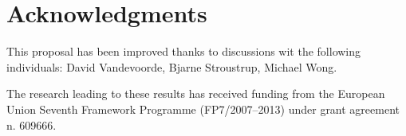 \section*{Acknowledgments}

This proposal has been improved thanks to discussions wit the following individuals:
David Vandevoorde,
Bjarne Stroustrup,
Michael Wong.

The research leading to these results has received funding from the European
Union Seventh Framework Programme (FP7/2007--2013) under grant agreement n.
609666.
